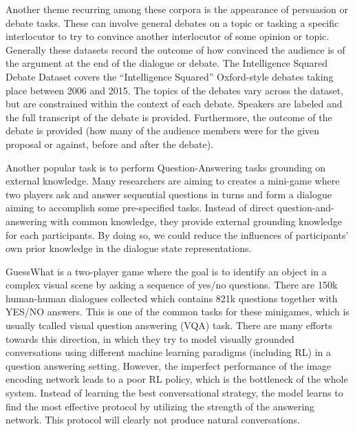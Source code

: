 \documentclass[bsc,frontabs,twoside,singlespacing,parskip,deptreport]{infthesis}     %
\begin{document}
Another theme recurring among these corpora is the appearance of persuasion or debate tasks. These can involve general debates on a topic or tasking a specific interlocutor to try to convince another interlocutor of some opinion or topic. Generally these datasets record the outcome of how convinced the audience is of the argument at the end of the dialogue or debate. The Intelligence Squared Debate Dataset\cite{zhang2016conversational} covers the “Intelligence Squared” Oxford-style debates taking place between 2006 and 2015. The topics of the debates vary across the dataset, but are constrained within the context of each debate. Speakers are labeled and the full transcript of the debate is provided. Furthermore, the outcome of the debate is provided (how many of the audience members were for the given proposal or against, before and after the debate).

Another popular task is to perform  Question-Answering tasks grounding on external knowledge. Many researchers are aiming to creates a mini-game where two players ask and answer sequential questions in turns and form a dialogue aiming to accomplish some pre-specified tasks. Instead of direct question-and-answering with common knowledge, they provide external grounding knowledge for each participants. By doing so, we could reduce the influences of participants' own prior knowledge in the dialogue state representations.

GuessWhat\cite{de2017guesswhat} is a two-player game where the goal is to identify an object in a complex visual scene by asking a sequence of yes/no questions. There are 150k human-human dialogues collected which contains 821k questions together with YES/NO answers. This is one of the common tasks for these minigames, which is usually tcalled visual question answering (VQA) task. There are many efforts towards this direction\cite{strub2017end,shekhar2017foil,reddy2019coqa,zhou2018dataset,de2017guesswhat,das2017visual,das2017learning}, in which they try to model visually grounded conversations using different machine learning paradigms (including RL) in a question answering setting. However, the imperfect performance of the image encoding network leads to a poor RL policy, which is the bottleneck of the whole system. Instead of learning the best conversational strategy, the model learns to find the most effective protocol by utilizing the strength of the answering network. This protocol will clearly not produce natural conversations.
\end{document}
